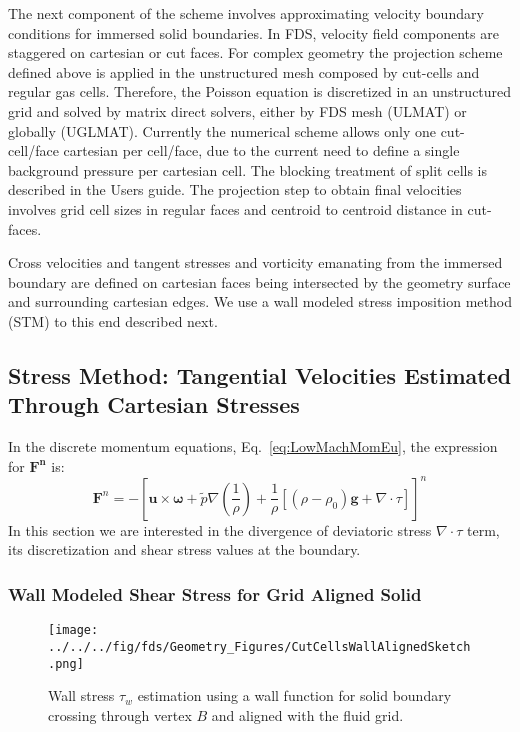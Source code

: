 The next component of the scheme involves approximating velocity boundary conditions for immersed solid boundaries. In FDS, velocity field components are staggered on cartesian or cut faces. 
For complex geometry the projection scheme defined above is applied in the unstructured mesh composed by cut-cells and regular gas cells. Therefore, the Poisson equation is discretized in an unstructured grid and solved by matrix direct solvers, either by FDS mesh ({\ct ULMAT}) or globally ({\ct UGLMAT}). Currently the numerical scheme allows only one cut-cell/face cartesian per cell/face, due to the current need to define a single background pressure per cartesian cell. The blocking treatment of split cells is described in the Users guide. The projection step to obtain final velocities involves grid cell sizes in regular faces and centroid to centroid distance in cut-faces.

Cross velocities and tangent stresses and vorticity emanating from the immersed boundary are defined on cartesian faces being intersected by the geometry surface and surrounding cartesian edges. We use a wall modeled stress imposition method (STM) to this end described next.
 
\subsection{Stress Method: Tangential Velocities Estimated Through Cartesian Stresses}

In the discrete momentum equations, Eq.~\eqref{eq:LowMachMomEu}, the expression for $\mathbf{F^n}$ is:
%
\begin{equation}
   \mathbf{F}^n = -\left[ \mathbf{u} \times \boldsymbol{\omega} + \tilde{p} \nabla \left( \frac{1}{\rho} \right) 
   + \frac{1}{\rho} \left[ (\rho-\rho_0) \mathbf{g} + \nabla \cdot \tau \right]  \right]^n \label{eqn:momfn}
\end{equation} 
%
In this section we are interested in the divergence of deviatoric stress $ \nabla \cdot \tau$ term, its discretization and shear stress values at the boundary.

\subsubsection{Wall Modeled Shear Stress for Grid Aligned Solid}

\begin{figure}[h]
      \centering
       \texttt{[image: ../../../fig/fds/Geometry\_Figures/CutCellsWallAlignedSketch.png]}
      \caption{Wall stress $\tau_w$ estimation using a wall function for solid boundary crossing through vertex $B$ and aligned with the fluid grid.}
        \label{Fig:Strss}
\end{figure}
%


